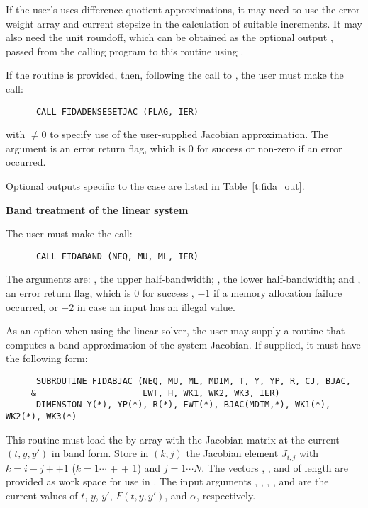 \begin{Steps}
  If the user's  uses difference quotient approximations, it
  may need to use the error weight array  and current stepsize 
  in the calculation of suitable increments.  It may also need the unit
  roundoff, which can be obtained as the optional output ,
  passed from the calling program to this routine using .

  If the  routine is provided, then, 
  following the call to , the user must make the call:
\begin{verbatim}
      CALL FIDADENSESETJAC (FLAG, IER)
\end{verbatim}
  with  $\neq 0$ to specify use of the user-supplied Jacobian
  approximation.  The argument  is an error return flag, which is $0$ 
  for success or non-zero if an error occurred.
  
  Optional outputs specific to the {\dense} case are listed in
  Table~\ref{t:fida_out}.


  {\s} {\bf Band treatment of the linear system}
  
  The user must make the call:
\begin{verbatim}
      CALL FIDABAND (NEQ, MU, ML, IER)
\end{verbatim}
  The arguments are: , the upper half-bandwidth; , 
  the lower half-bandwidth; and , an error return flag, which is  
  $0$ for success , $-1$ if a memory allocation failure occurred, or $-2$ 
  in case an input has an illegal value.     
  
  As an option when using the {\band} linear solver, the user may supply a
  routine that computes a band approximation of the system Jacobian. If supplied,
  it must have the following form:
\begin{verbatim}
      SUBROUTINE FIDABJAC (NEQ, MU, ML, MDIM, T, Y, YP, R, CJ, BJAC,
     &                     EWT, H, WK1, WK2, WK3, IER)
      DIMENSION Y(*), YP(*), R(*), EWT(*), BJAC(MDIM,*), WK1(*), WK2(*), WK3(*)
\end{verbatim}
  This routine must load the  by  array  with the
  Jacobian matrix at the current $(t, y, y')$ in band form.  Store in
  $(k,j)$ the Jacobian element $J_{i,j}$ with $k = i - j + $$ + 1$
  ($k = 1 \cdots $ +  + 1) and $j = 1 \cdots N$. The vectors
  , , and  of length  are provided as work space
  for use in .
  The input arguments , , , , and  are the
  current values of $t$, $y$, $y'$, $F(t,y,y')$, and $\alpha$, respectively.


\end{Steps}
